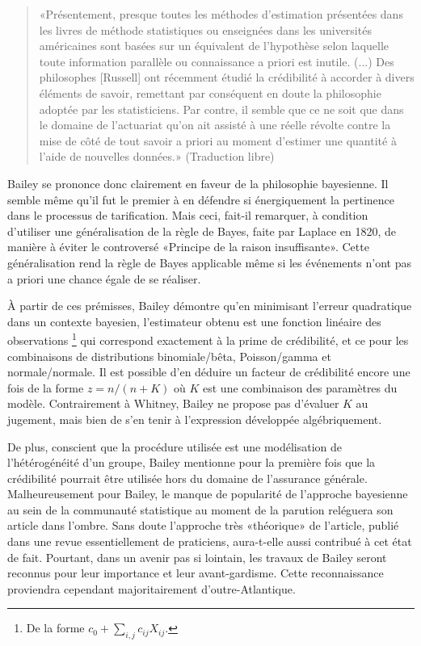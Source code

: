 \begin{quote}
  «Présentement, presque toutes les méthodes d'estimation présentées
  dans les livres de méthode statistiques ou enseignées dans les
  universités américaines sont basées sur un équivalent de l'hypothèse
  selon laquelle toute information parallèle ou connaissance a priori
  est inutile. (...) Des philosophes [Russell] ont récemment étudié la
  crédibilité à accorder à divers éléments de savoir, remettant par
  conséquent en doute la philosophie adoptée par les statisticiens.
  Par contre, il semble que ce ne soit que dans le domaine de
  l'actuariat qu'on ait assisté à une réelle révolte contre la mise de
  côté de tout savoir a priori au moment d'estimer une quantité à
  l'aide de nouvelles données.» (Traduction libre)
\end{quote}

Bailey se prononce donc clairement en faveur de la philosophie
bayesienne. Il semble même qu'il fut le premier à en défendre si
énergiquement la pertinence dans le processus de tarification. Mais
ceci, fait-il remarquer, à condition d'utiliser une généralisation de
la règle de Bayes, faite par Laplace en 1820, de manière à éviter le
controversé «Principe de la raison insuffisante». Cette généralisation
rend la règle de Bayes applicable même si les événements n'ont pas a
priori une chance égale de se réaliser.

À partir de ces prémisses, Bailey démontre qu'en minimisant l'erreur
quadratique dans un contexte bayesien, l'estimateur obtenu est une
fonction linéaire des observations%
\footnote{De la forme $c_0 + \sum_{i,j} c_{ij} X_{ij}$.} %
qui correspond exactement à la prime de crédibilité, et ce pour les
combinaisons de distributions binomiale/bêta, Poisson/gamma et
normale/normale. Il est possible d'en déduire un facteur de
crédibilité encore une fois de la forme $z = n/(n + K)$ où $K$ est une
combinaison des paramètres du modèle.  Contrairement à Whitney, Bailey
ne propose pas d'évaluer $K$ au jugement, mais bien de s'en tenir à
l'expression développée algébriquement.

De plus, conscient que la procédure utilisée est une modélisation de
l'hétérogénéité d'un groupe, Bailey mentionne pour la première fois
que la crédibilité pourrait être utilisée hors du domaine de
l'assurance générale. Malheureusement pour Bailey, le manque de
popularité de l'approche bayesienne au sein de la communauté
statistique au moment de la parution reléguera son article dans
l'ombre. Sans doute l'approche très «théorique» de l'article, publié
dans une revue essentiellement de praticiens, aura-t-elle aussi
contribué à cet état de fait. Pourtant, dans un avenir pas si
lointain, les travaux de Bailey seront reconnus pour leur importance
et leur avant-gardisme. Cette reconnaissance proviendra cependant
majoritairement d'outre-Atlantique.

